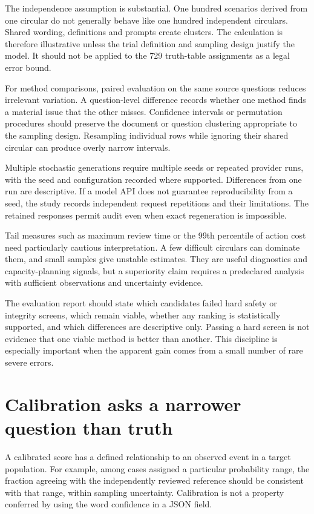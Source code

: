 \documentclass[12pt,a4paper,oneside,openany]{book}
\begin{document}
The independence assumption is substantial. One hundred scenarios derived from
one circular do not generally behave like one hundred independent circulars.
Shared wording, definitions and prompts create clusters. The calculation is
therefore illustrative unless the trial definition and sampling design justify
the model. It should not be applied to the 729 truth-table assignments as a legal
error bound.

For method comparisons, paired evaluation on the same source questions reduces
irrelevant variation. A question-level difference records whether one method
finds a material issue that the other misses. Confidence intervals or permutation
procedures should preserve the document or question clustering appropriate to the
sampling design. Resampling individual rows while ignoring their shared circular
can produce overly narrow intervals.

Multiple stochastic generations require multiple seeds or repeated provider runs,
with the seed and configuration recorded where supported. Differences from one
run are descriptive. If a model API does not guarantee reproducibility from a
seed, the study records independent request repetitions and their limitations.
The retained responses permit audit even when exact regeneration is impossible.

Tail measures such as maximum review time or the 99th percentile of action cost
need particularly cautious interpretation. A few difficult circulars can dominate
them, and small samples give unstable estimates. They are useful diagnostics and
capacity-planning signals, but a superiority claim requires a predeclared analysis
with sufficient observations and uncertainty evidence.

The evaluation report should state which candidates failed hard safety or
integrity screens, which remain viable, whether any ranking is statistically
supported, and which differences are descriptive only. Passing a hard screen is
not evidence that one viable method is better than another. This discipline is
especially important when the apparent gain comes from a small number of rare
severe errors.

\section{Calibration asks a narrower question than truth}
\label{merge:M09:08}


A calibrated score has a defined relationship to an observed event in a target
population. For example, among cases assigned a particular probability range,
the fraction agreeing with the independently reviewed reference should be
consistent with that range, within sampling uncertainty. Calibration is not a
property conferred by using the word confidence in a JSON field.
\end{document}
